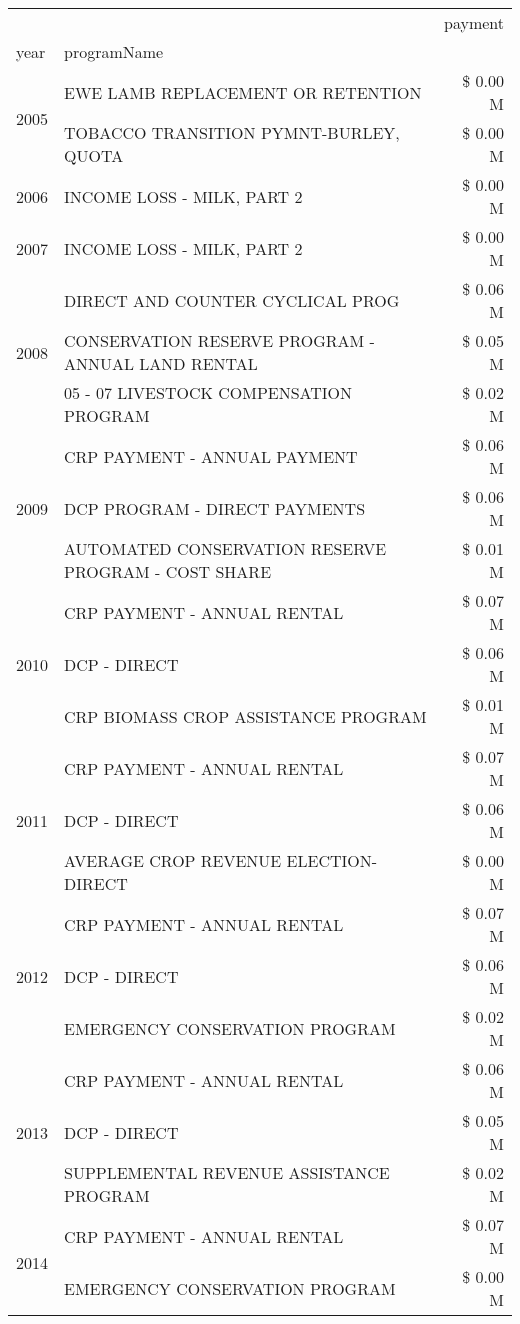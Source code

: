 \begin{tabular}{llr}
\toprule
 &  & payment \\
year & programName &  \\
\midrule
\multirow[t]{2}{*}{2005} & EWE LAMB REPLACEMENT OR RETENTION & \$ 0.00 M \\
 & TOBACCO TRANSITION PYMNT-BURLEY, QUOTA & \$ 0.00 M \\
\cline{1-3}
2006 & INCOME LOSS - MILK, PART 2 & \$ 0.00 M \\
\cline{1-3}
2007 & INCOME LOSS - MILK, PART 2 & \$ 0.00 M \\
\cline{1-3}
\multirow[t]{3}{*}{2008} & DIRECT AND COUNTER CYCLICAL PROG & \$ 0.06 M \\
 & CONSERVATION RESERVE PROGRAM - ANNUAL LAND RENTAL & \$ 0.05 M \\
 & 05 - 07 LIVESTOCK COMPENSATION PROGRAM & \$ 0.02 M \\
\cline{1-3}
\multirow[t]{3}{*}{2009} & CRP PAYMENT - ANNUAL PAYMENT & \$ 0.06 M \\
 & DCP PROGRAM - DIRECT PAYMENTS & \$ 0.06 M \\
 & AUTOMATED CONSERVATION RESERVE PROGRAM - COST SHARE & \$ 0.01 M \\
\cline{1-3}
\multirow[t]{3}{*}{2010} & CRP PAYMENT - ANNUAL RENTAL & \$ 0.07 M \\
 & DCP - DIRECT & \$ 0.06 M \\
 & CRP BIOMASS CROP ASSISTANCE PROGRAM & \$ 0.01 M \\
\cline{1-3}
\multirow[t]{3}{*}{2011} & CRP PAYMENT - ANNUAL RENTAL & \$ 0.07 M \\
 & DCP - DIRECT & \$ 0.06 M \\
 & AVERAGE CROP REVENUE ELECTION-DIRECT & \$ 0.00 M \\
\cline{1-3}
\multirow[t]{3}{*}{2012} & CRP PAYMENT - ANNUAL RENTAL & \$ 0.07 M \\
 & DCP - DIRECT & \$ 0.06 M \\
 & EMERGENCY CONSERVATION PROGRAM & \$ 0.02 M \\
\cline{1-3}
\multirow[t]{3}{*}{2013} & CRP PAYMENT - ANNUAL RENTAL & \$ 0.06 M \\
 & DCP - DIRECT & \$ 0.05 M \\
 & SUPPLEMENTAL REVENUE ASSISTANCE PROGRAM & \$ 0.02 M \\
\cline{1-3}
\multirow[t]{3}{*}{2014} & CRP PAYMENT - ANNUAL RENTAL & \$ 0.07 M \\
 & EMERGENCY CONSERVATION PROGRAM & \$ 0.00 M \\

\end{tabular}
